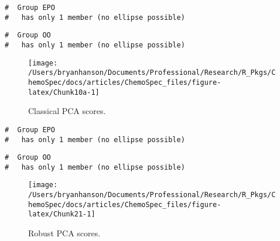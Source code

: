 \documentclass[letter,10pt,twocolumn,twoside,printwatermark=false]{pinp}
\begin{document}
\begin{ShadedResult}
\begin{verbatim}
#  Group EPO
#   has only 1 member (no ellipse possible)
\end{verbatim}
\end{ShadedResult}
\begin{ShadedResult}
\begin{verbatim}
#  Group OO
#   has only 1 member (no ellipse possible)
\end{verbatim}
\end{ShadedResult}
\begin{figure}

{\centering \texttt{[image: /Users/bryanhanson/Documents/Professional/Research/R\_Pkgs/ChemoSpec/docs/articles/ChemoSpec\_files/figure-latex/Chunk10a-1]} 

}

\caption{\label{classPCA}Classical PCA scores.}\label{fig:Chunk10a}
\end{figure}

\begin{Shaded}
\begin{Highlighting}[]
\StringTok{ }
   \NormalTok{)}
   \NormalTok{(}\NormalTok{,}\NormalTok{),}
   \NormalTok{,}
   \NormalTok{)}
\end{Highlighting}
\end{Shaded}

\begin{ShadedResult}
\begin{verbatim}
#  Group EPO
#   has only 1 member (no ellipse possible)
\end{verbatim}
\end{ShadedResult}
\begin{ShadedResult}
\begin{verbatim}
#  Group OO
#   has only 1 member (no ellipse possible)
\end{verbatim}
\end{ShadedResult}
\begin{figure}

{\centering \texttt{[image: /Users/bryanhanson/Documents/Professional/Research/R\_Pkgs/ChemoSpec/docs/articles/ChemoSpec\_files/figure-latex/Chunk21-1]} 

}

\caption{\label{robPCA}Robust PCA scores.}\label{fig:Chunk21}
\end{figure}
\end{document}
